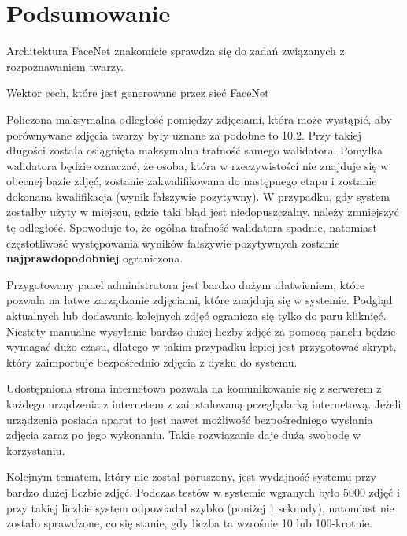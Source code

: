 \chapter*{Podsumowanie}

Architektura FaceNet znakomicie sprawdza się do zadań związanych z rozpoznawaniem twarzy.

Wektor cech, które jest generowane przez sieć FaceNet

Policzona maksymalna odległość pomiędzy zdjęciami, która może wystąpić,
aby porównywane zdjęcia twarzy były uznane za podobne to \num{10.2}.
Przy takiej długości została osiągnięta maksymalna trafność samego walidatora.
Pomyłka walidatora będzie oznaczać, że osoba, która w rzeczywistości nie znajduje się w obecnej bazie zdjęć,
zostanie zakwalifikowana do następnego etapu i zostanie dokonana kwalifikacja (wynik fałszywie pozytywny).
W przypadku, gdy system zostałby użyty w miejscu, gdzie taki błąd jest niedopuszczalny, należy zmniejszyć tę odległość.
Spowoduje to, że ogólna trafność walidatora spadnie, natomiast częstotliwość występowania wyników fałszywie
pozytywnych zostanie \textbf{najprawdopodobniej} ograniczona.

Przygotowany panel administratora jest bardzo dużym ułatwieniem,
które pozwala na łatwe zarządzanie zdjęciami, które znajdują się w systemie.
Podgląd aktualnych lub dodawania kolejnych zdjęć ogranicza się tylko do paru kliknięć.
Niestety manualne wysyłanie bardzo dużej liczby zdjęć za pomocą panelu będzie wymagać dużo czasu,
dlatego w takim przypadku lepiej jest przygotować skrypt, który zaimportuje bezpośrednio zdjęcia z dysku do systemu.

Udostępniona strona internetowa pozwala na komunikowanie się z serwerem
z każdego urządzenia z internetem z zainstalowaną przeglądarką internetową.
Jeżeli urządzenia posiada aparat to jest nawet możliwość bezpośredniego wysłania zdjęcia zaraz po jego wykonaniu.
Takie rozwiązanie daje dużą swobodę w korzystaniu.


Kolejnym tematem, który nie został poruszony, jest wydajność systemu przy bardzo dużej liczbie zdjęć.
Podczas testów w systemie wgranych było 5000 zdjęć i przy takiej liczbie system odpowiadał szybko (poniżej 1 sekundy),
natomiast nie zostało sprawdzone, co się stanie, gdy liczba ta wzrośnie 10 lub 100-krotnie.

